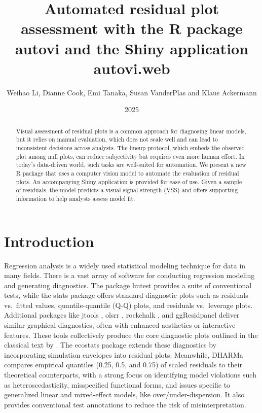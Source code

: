 \documentclass[
doublespace,
  times]{anzsauth}
\title{Automated residual plot assessment with the \textsf{R} package
\textsf{autovi} and the \textsf{Shiny} application \textsf{autovi.web}}
\author{
Weihao Li\addressnum{1, 2},
Dianne Cook\addressnum{1},
Emi Tanaka\addressnum{2},
Susan VanderPlas\addressnum{3} and
Klaus Ackermann\addressnum{1}
}
\affiliation{
Monash University,
The Australian National University and
University of Nebraska
}
\date{2025}
\begin{document}
\begin{abstract}
Visual assessment of residual plots is a common approach for diagnosing
linear models, but it relies on manual evaluation, which does not scale
well and can lead to inconsistent decisions across analysts. The lineup
protocol, which embeds the observed plot among null plots, can reduce
subjectivity but requires even more human effort. In today's data-driven
world, such tasks are well-suited for automation. We present a new
\textsf{R} package that uses a computer vision model to automate the
evaluation of residual plots. An accompanying \textsf{Shiny} application
is provided for ease of use. Given a sample of residuals, the model
predicts a visual signal strength (VSS) and offers supporting
information to help analysts assess model fit.
\end{abstract}

          

\maketitle


\section{Introduction}\label{sec-autovi-introduction}

Regression analysis is a widely used statistical modeling technique for
data in many fields. There is a vast array of software for conducting
regression modeling and generating diagnostics. The package
\textsf{lmtest} \citep{lmtest} provides a suite of conventional tests,
while the \textsf{stats} package \citep{stats} offers standard
diagnostic plots such as residuals vs.~fitted values, quantile-quantile
(Q-Q) plots, and residuals vs.~leverage plots. Additional packages like
\textsf{jtools} \citep{jtools}, \textsf{olsrr} \citep{olsrr},
\textsf{rockchalk} \citep{rockchalk}, and \textsf{ggResidpanel}
\citep{ggresidpanel} deliver similar graphical diagnostics, often with
enhanced aesthetics or interactive features. These tools collectively
produce the core diagnostic plots outlined in the classical text by
\citet{cook1982residuals}. The \textsf{ecostats} package
\citep{warton_global_2023} extends these diagnostics by incorporating
simulation envelopes into residual plots. Meanwhile, \textsf{DHARMa}
\citep{dharma} compares empirical quantiles (0.25, 0.5, and 0.75) of
scaled residuals to their theoretical counterparts, with a strong focus
on identifying model violations such as heteroscedasticity, misspecified
functional forms, and issues specific to generalized linear and
mixed-effect models, like over/under-dispersion. It also provides
conventional test annotations to reduce the risk of misinterpretation.
\end{document}

